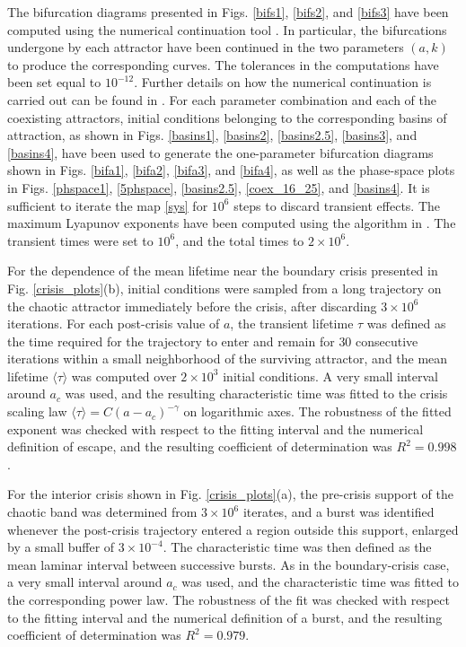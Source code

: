 \documentclass{article}
\theoremstyle{plain}
\theoremstyle{definition}
\begin{document}
The bifurcation diagrams presented in Figs. \ref{bifs1}, \ref{bifs2}, and \ref{bifs3} have been computed using the numerical continuation tool \cite{matcont}. In particular, the bifurcations undergone by each attractor have been continued in the two parameters $(a,k)$ to produce the corresponding curves. The tolerances in the computations have been set equal to $10^{-12}$. Further details on how the numerical continuation is carried out can be found in \cite{matcont}. For each parameter combination and each of the coexisting attractors, initial conditions belonging to the corresponding basins of attraction, as shown in Figs. \ref{basins1}, \ref{basins2}, \ref{basins2.5}, \ref{basins3}, and \ref{basins4}, have been used to generate the one-parameter bifurcation diagrams shown in Figs. \ref{bifa1}, \ref{bifa2}, \ref{bifa3}, and \ref{bifa4}, as well as the phase-space plots in Figs. \ref{phspace1}, \ref{5phspace}, \ref{basins2.5}, \ref{coex_16_25}, and \ref{basins4}. It is sufficient to iterate the map \eqref{sys} for $10^6$ steps to discard transient effects. The maximum Lyapunov exponents have been computed using the algorithm in \cite{datseris}. The transient times were set to $10^6$, and the total times to $2\times 10^6$.

For the dependence of the mean lifetime near the boundary crisis presented in Fig. \ref{crisis_plots}(b), initial conditions were sampled from a long trajectory on the chaotic attractor immediately before the crisis, after discarding $3\times10^6$ iterations. For each post-crisis value of $a$, the transient lifetime $\tau$ was defined as the time required for the trajectory to enter and remain for $30$ consecutive iterations within a small neighborhood of the surviving attractor, and the mean lifetime $\langle\tau\rangle$ was computed over $2\times10^3$ initial conditions. A very small interval around $a_c$ was used, and the resulting characteristic time was fitted to the crisis scaling law $\langle\tau\rangle=C(a-a_c)^{-\gamma}$ on logarithmic axes. The robustness of the fitted exponent was checked with respect to the fitting interval and the numerical definition of escape, and the resulting coefficient of determination was $R^2=0.998$.

For the interior crisis shown in Fig. \ref{crisis_plots}(a), the pre-crisis support of the chaotic band was determined from $3\times10^6$ iterates, and a burst was identified whenever the post-crisis trajectory entered a region outside this support, enlarged by a small buffer of $3\times10^{-4}$. The characteristic time was then defined as the mean laminar interval between successive bursts. As in the boundary-crisis case, a very small interval around $a_c$ was used, and the characteristic time was fitted to the corresponding power law. The robustness of the fit was checked with respect to the fitting interval and the numerical definition of a burst, and the resulting coefficient of determination was $R^2=0.979$.
\end{document}
